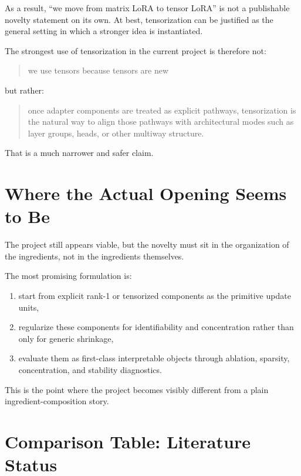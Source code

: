 \documentclass[11pt]{article}
\begin{document}
As a result, ``we move from matrix LoRA to tensor LoRA'' is not a publishable novelty statement on its own. At best, tensorization can be justified as the general setting in which a stronger idea is instantiated.

The strongest use of tensorization in the current project is therefore not:

\begin{quote}
we use tensors because tensors are new
\end{quote}

but rather:

\begin{quote}
once adapter components are treated as explicit pathways, tensorization is the natural way to align those pathways with architectural modes such as layer groups, heads, or other multiway structure.
\end{quote}

That is a much narrower and safer claim.

\section{Where the Actual Opening Seems to Be}

The project still appears viable, but the novelty must sit in the organization of the ingredients, not in the ingredients themselves.

The most promising formulation is:

\begin{enumerate}
\item start from explicit rank-1 or tensorized components as the primitive update units,
\item regularize these components for identifiability and concentration rather than only for generic shrinkage,
\item evaluate them as first-class interpretable objects through ablation, sparsity, concentration, and stability diagnostics.
\end{enumerate}

This is the point where the project becomes visibly different from a plain ingredient-composition story.

\section{Comparison Table: Literature Status}
\end{document}
